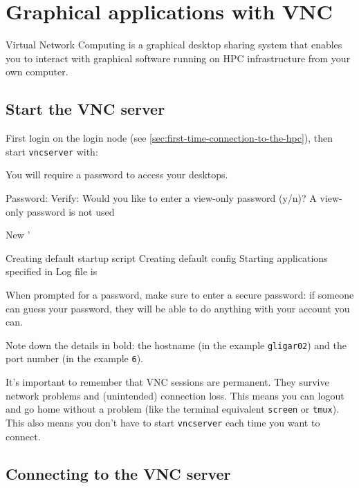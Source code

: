 \chapter{Graphical applications with VNC}
\label{ch:vnc}

Virtual Network Computing is a graphical desktop sharing system that enables you
to interact with graphical software running on HPC infrastructure from your own
computer.

\section{Start the VNC server}
\label{sec:start-vnc}

First login on the login node (see \autoref{sec:first-time-connection-to-the-hpc}),
then start \lstinline|vncserver| with:

\begin{prompt}
You will require a password to access your desktops.

Password:%
Verify:%
Would you like to enter a view-only password (y/n)? %
A view-only password is not used

New '%

Creating default startup script %
Creating default config %
Starting applications specified in %
Log file is %

\end{prompt}

When prompted for a password, make sure to enter a secure password: if someone
can guess your password, they will be able to do anything with your account you can.

Note down the details in bold: the hostname (in the example \lstinline|gligar02|)
and the port number (in the example \lstinline|6|).

It's important to remember that VNC sessions are permanent. They survive network
problems and (unintended) connection loss. This means you can logout and go home
without a problem (like the terminal equivalent \lstinline|screen| or \lstinline|tmux|).
This also means you don't have to start \lstinline|vncserver| each time you want to connect.

\section{Connecting to the VNC server}

